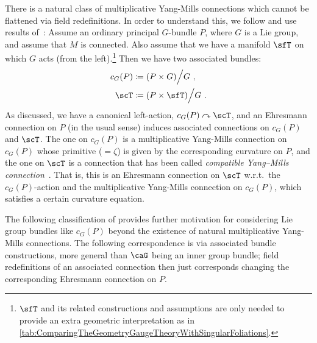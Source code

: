\documentclass[reqno,a4paper,oneside]{amsart}
\theoremstyle{plain}
\theoremstyle{remark}
\theoremstyle{definition}
\begin{document}
There is a natural class of multiplicative Yang-Mills connections which cannot be flattened via field redefinitions. In order to understand this, we follow and use results of~\cite[in particular the appendix]{Fischer:2401.05966}: Assume an ordinary principal $G$-bundle $P$, where $G$ is a Lie group, and assume that $M$ is connected. Also assume that we have a manifold $\sfT$ on which $G$ acts (from the left).\footnote{$\sfT$ and its related constructions and assumptions are only needed to provide an extra geometric interpretation as in \ref{tab:ComparingTheGeometryGaugeTheoryWithSingularFoliations}.} Then we have two associated bundles: 
    \begin{equation}
        \begin{aligned}
            c_G(P) &\coloneqq (P \times G) \Big/ G~,
            \\
            \scT &\coloneqq (P \times \sfT) \Big/ G~.
        \end{aligned}
    \end{equation}
		As discussed, we have a canonical left-action, $c_G(P) \curvearrowright \scT$, and an Ehresmann connection on $P$ (in the usual sense) induces associated connections on $c_G(P)$ and $\scT$. The one on $c_G(P)$ is a multiplicative Yang-Mills connection on $c_G(P)$ whose primitive ($= \zeta$) is given by the corresponding curvature on $P$, and the one on $\scT$ is a connection that has been called \emph{compatible Yang--Mills connection}~\cite{Fischer:2401.05966}. That is, this is an Ehresmann connection on $\scT$ w.r.t.~the $c_G(P)$-action and the multiplicative Yang-Mills connection on $c_G(P)$, which satisfies a certain curvature equation.
    
    The following classification of \cite{Fischer:2401.05966} provides further motivation for considering Lie group bundles like $c_G(P)$ beyond the existence of natural multiplicative Yang-Mills connections. The following correspondence is via associated bundle constructions, more general than $\caG$ being an inner group bundle; field redefinitions of an associated connection then just corresponds changing the corresponding Ehresmann connection on $P$.
		
\end{document}
